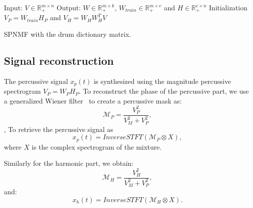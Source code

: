 \begin{algorithm}[h]
 Input: $V \in \mathbb{R}_{+}^{m \times n} $
 Output: $W \in \mathbb{R}_{+}^{m \times k}$, $W_{train} \in \mathbb{R}_+^{m \times e}$ and $H \in \mathbb{R}_{+}^{e \times n}$
 Initialization\;
 $ V_P = W_{train}H_P $ and
 $ V_H = W_HW_H^TV $ 
  
\vspace{0.2cm}
 \caption{SPNMF with the drum dictionary matrix.}\label{AlgoDictionary}
\end{algorithm}


 
 
\subsection{Signal reconstruction}

The percussive signal $x_p(t)$ is synthesized using the magnitude percussive spectrogram $V_P = W_PH_P$. To reconstruct the phase of the percussive part, we use a generalized Wiener filter~\cite{liutkus:hal-01110028} to create a percussive mask as:
\begin{equation}
\mathcal{M}_P = \frac{V_P^2}{V_M^2 + V_P^2},
\end{equation} 
\noindent, To retrieve the percussive signal as 
\begin{equation}
x_p(t) = InverseSTFT(\mathcal{M}_P \otimes X),
\end{equation}
\noindent where $X$ is the complex spectrogram of the mixture.

Similarly for the harmonic part, we obtain:
\begin{equation}\label{percuwiener}
\mathcal{M}_H = \frac{V_H^2}{V_M^2 + V_P^2},
\end{equation}
and:
\begin{equation}
x_h(t) = InverseSTFT(\mathcal{M}_H \otimes X).
\end{equation}


